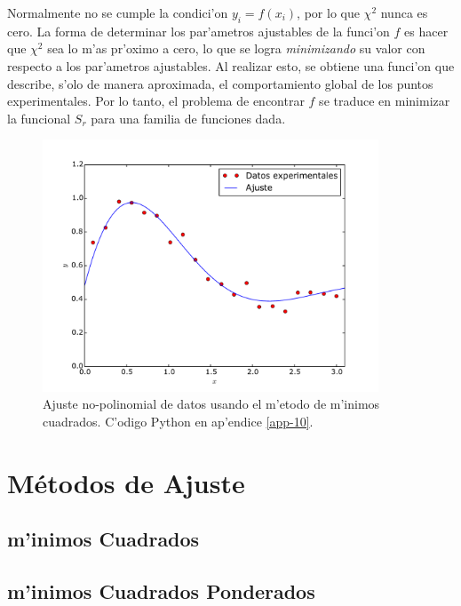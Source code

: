 \documentclass[a4paper]{report}
\begin{document}
Normalmente no se cumple la condici'on $y_i = f(x_i)$, por lo que $\chi^2$ nunca es cero. La forma de determinar los par'ametros ajustables de la funci'on $f$ es hacer que $\chi^2$ sea lo m'as pr'oximo a cero, lo que se logra \textit{minimizando} su valor con respecto a los par'ametros ajustables. Al realizar esto, se obtiene una funci'on que describe, s'olo de manera aproximada, el comportamiento global de los puntos experimentales.
Por lo tanto, el problema de encontrar $f$ se traduce en minimizar la funcional $S_{r}$ para una familia de funciones dada. 
\begin{figure}[h!]
\begin{center}
\includegraphics[width=10cm]{figs/fig-mmc-2.pdf}
\caption{Ajuste no-polinomial de datos usando el m'etodo de m'inimos cuadrados. C'odigo Python en ap'endice \ref{app-10}.}
\end{center}
\label{fig-mmc-2}
\end{figure}
\section{M\'etodos de Ajuste}
\subsection{m'inimos Cuadrados}

\subsection{m'inimos Cuadrados Ponderados}
\end{document}
